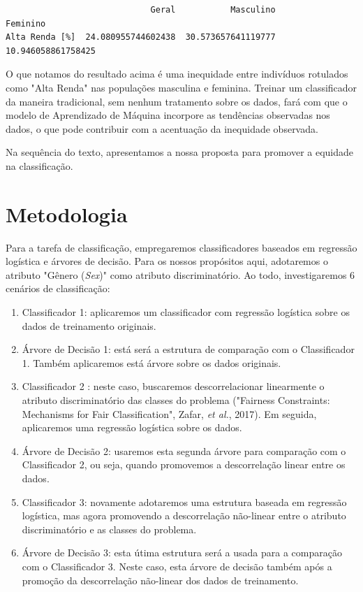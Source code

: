 \documentclass[11pt]{article}
\begin{document}
    
    \begin{verbatim}
                             Geral           Masculino            Feminino
Alta Renda [%]  24.080955744602438  30.573657641119777  10.946058861758425
    \end{verbatim}

    
    O que notamos do resultado acima é uma inequidade entre indivíduos
rotulados como "Alta Renda" nas populações masculina e feminina. Treinar
um classificador da maneira tradicional, sem nenhum tratamento sobre os
dados, fará com que o modelo de Aprendizado de Máquina incorpore as
tendências observadas nos dados, o que pode contribuir com a acentuação
da inequidade observada.

Na sequência do texto, apresentamos a nossa proposta para promover a
equidade na classificação.

    \section{Metodologia}\label{metodologia}

Para a tarefa de classificação, empregaremos classificadores baseados em
regressão logística e árvores de decisão. Para os nossos propósitos
aqui, adotaremos o atributo "Gênero (\emph{Sex})" como atributo
discriminatório. Ao todo, investigaremos 6 cenários de classificação:

\begin{enumerate}
\def\labelenumi{\arabic{enumi})}
\item
  Classificador 1: aplicaremos um classificador com regressão logística
  sobre os dados de treinamento originais.
\item
  Árvore de Decisão 1: está será a estrutura de comparação com o
  Classificador 1. Também aplicaremos está árvore sobre os dados
  originais.
\item
  Classificador 2 : neste caso, buscaremos descorrelacionar linearmente
  o atributo discriminatório das classes do problema ("Fairness
  Constraints: Mechanisms for Fair Classification", Zafar, \emph{et
  al.}, 2017). Em seguida, aplicaremos uma regressão logística sobre os
  dados.
\item
  Árvore de Decisão 2: usaremos esta segunda árvore para comparação com
  o Classificador 2, ou seja, quando promovemos a descorrelação linear
  entre os dados.
\item
  Classificador 3: novamente adotaremos uma estrutura baseada em
  regressão logística, mas agora promovendo a descorrelação não-linear
  entre o atributo discriminatório e as classes do problema.
\item
  Árvore de Decisão 3: esta útima estrutura será a usada para a
  comparação com o Classificador 3. Neste caso, esta árvore de decisão
  também após a promoção da descorrelação não-linear dos dados de
  treinamento.
\end{enumerate}
\end{document}

